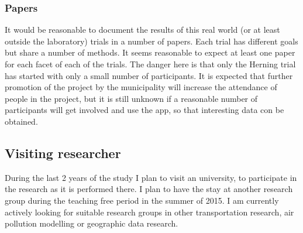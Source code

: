 \subsubsection{Papers}
It would be reasonable to document the results of this real world (or at least outside the laboratory) trials in a number of papers. Each trial has different goals but share a number of methods. It seems reasonable to expect at least one paper for each facet of each of the trials. The danger here is that only the Herning trial has started with only a small number of participants. It is expected that further promotion of the project by the municipality will increase the attendance of people in the project, but it is still unknown if a reasonable number of participants will get involved and use the app, so that interesting data con be obtained.



\subsection{Visiting researcher}
During the last 2 years of the study I plan to visit an university, to participate in the research as it is performed there. I plan to have the stay at another research group during the teaching free period in the summer of 2015. I am currently actively looking for suitable research groups in other transportation research, air pollution modelling or geographic data research.
